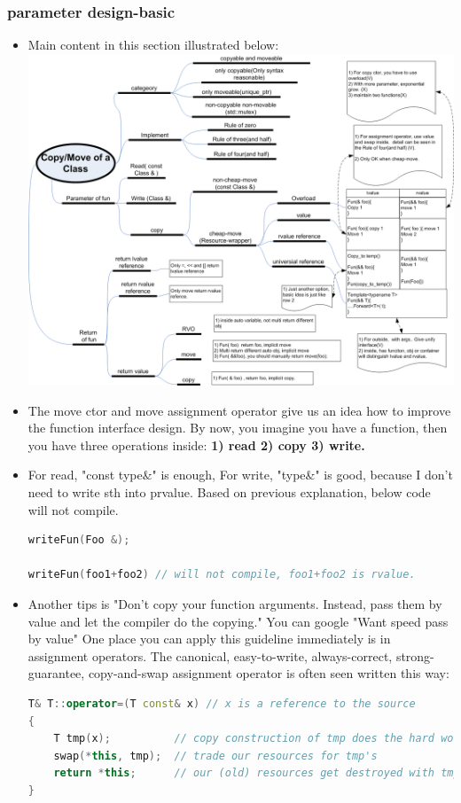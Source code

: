 \documentclass[a4paper,12pt,twoside]{book}
\begin{document}
\subsubsection{parameter design-basic}
\begin{itemize}
\item Main content in this section illustrated below: \\
\includegraphics[scale=0.9, angle=270]{pics/move.png}

\item The move ctor and move assignment operator give us an idea how to improve the function interface design. By now, you imagine you have a function, then you have three operations inside: \textbf{1) read 2) copy 3) write.}

\item For read, "const type\&" is enough, For write, "type\&" is good, because I don't need to write sth into prvalue. Based on previous explanation, below code will not compile. 
\begin{lstlisting}[frame=single, language=c++]
writeFun(Foo &);

writeFun(foo1+foo2) // will not compile, foo1+foo2 is rvalue.
\end{lstlisting}

\item Another tips is "Don’t copy your function arguments. Instead, pass them by value and let the compiler do the copying." You can google "Want speed pass by value" One place you can apply this guideline immediately is in assignment operators. The canonical, easy-to-write, always-correct, strong-guarantee, copy-and-swap assignment operator is often seen written this way:
\begin{lstlisting}[frame=single, language=c++]
T& T::operator=(T const& x) // x is a reference to the source
{ 
    T tmp(x);          // copy construction of tmp does the hard work
    swap(*this, tmp);  // trade our resources for tmp's
    return *this;      // our (old) resources get destroyed with tmp 
}


\end{lstlisting}
\end{itemize}
\end{document}
